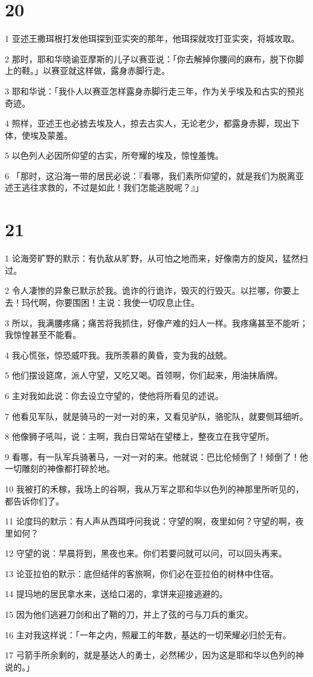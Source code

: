 \chapter{20}

\par 1 亚述王撒珥根打发他珥探到亚实突的那年，他珥探就攻打亚实突，将城攻取。
\par 2 那时，耶和华晓谕亚摩斯的儿子以赛亚说：「你去解掉你腰间的麻布，脱下你脚上的鞋。」以赛亚就这样做，露身赤脚行走。
\par 3 耶和华说：「我仆人以赛亚怎样露身赤脚行走三年，作为关乎埃及和古实的预兆奇迹。
\par 4 照样，亚述王也必掳去埃及人，掠去古实人，无论老少，都露身赤脚，现出下体，使埃及蒙羞。
\par 5 以色列人必因所仰望的古实，所夸耀的埃及，惊惶羞愧。
\par 6 「那时，这沿海一带的居民必说：『看哪，我们素所仰望的，就是我们为脱离亚述王逃往求救的，不过是如此！我们怎能逃脱呢？』」

\chapter{21}

\par 1 论海旁旷野的默示：有仇敌从旷野，从可怕之地而来，好像南方的旋风，猛然扫过。
\par 2 令人凄惨的异象已默示於我。诡诈的行诡诈，毁灭的行毁灭。以拦哪，你要上去！玛代啊，你要围困！主说：我使一切叹息止住。
\par 3 所以，我满腰疼痛；痛苦将我抓住，好像产难的妇人一样。我疼痛甚至不能听；我惊惶甚至不能看。
\par 4 我心慌张，惊恐威吓我。我所羡慕的黄昏，变为我的战兢。
\par 5 他们摆设筵席，派人守望，又吃又喝。首领啊，你们起来，用油抹盾牌。
\par 6 主对我如此说：你去设立守望的，使他将所看见的述说。
\par 7 他看见军队，就是骑马的一对一对的来，又看见驴队，骆驼队，就要侧耳细听。
\par 8 他像狮子吼叫，说：主啊，我白日常站在望楼上，整夜立在我守望所。
\par 9 看哪，有一队军兵骑著马，一对一对的来。他就说：巴比伦倾倒了！倾倒了！他一切雕刻的神像都打碎於地。
\par 10 我被打的禾稼，我场上的谷啊，我从万军之耶和华以色列的神那里所听见的，都告诉你们了。
\par 11 论度玛的默示：有人声从西珥呼问我说：守望的啊，夜里如何？守望的啊，夜里如何？
\par 12 守望的说：早晨将到，黑夜也来。你们若要问就可以问，可以回头再来。
\par 13 论亚拉伯的默示：底但结伴的客旅啊，你们必在亚拉伯的树林中住宿。
\par 14 提玛地的居民拿水来，送给口渴的，拿饼来迎接逃避的。
\par 15 因为他们逃避刀剑和出了鞘的刀，并上了弦的弓与刀兵的重灾。
\par 16 主对我这样说：「一年之内，照雇工的年数，基达的一切荣耀必归於无有。
\par 17 弓箭手所余剩的，就是基达人的勇士，必然稀少，因为这是耶和华以色列的神说的。」


